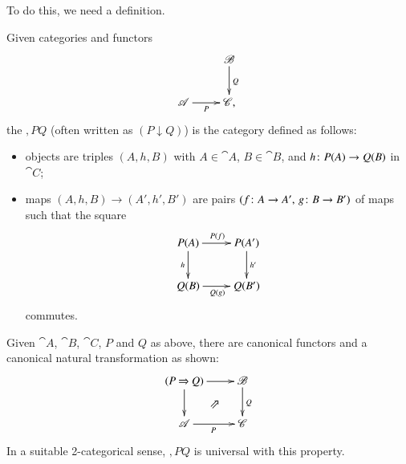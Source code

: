 To do this, we need a definition.

\begin{defn}
\label{defn:comma-cat}
Given categories and functors
\[
\xymatrix{
        &\cat{B} \ar[d]^Q       \\
\cat{A} \ar[r]_P        &
\cat{C},
}
\]
the  $\comma{P}{Q}$%
%
%
(often written as $(P \mathbin{\downarrow} Q)$) is the category defined as
follows:
% 
\begin{itemize}
\item 
objects are triples $(A, h, B)$ with $A \in \cat{A}$, $B \in \cat{B}$, and
$h\from P(A) \to Q(B)$ in $\cat{C}$;

\item 
maps $(A, h, B) \to (A', h', B')$ are pairs $(f\from A \to A',\, g\from B
\to B')$ of maps such that the square
\[
\xymatrix{
P(A)    \ar[r]^{P(f)} \ar[d]_h  &
P(A')   \ar[d]^{h'}     \\
Q(B) \ar[r]_{Q(g)}      &
Q(B')
}
\]
commutes.
\end{itemize}
\end{defn}

\begin{remark}
Given $\cat{A}$, $\cat{B}$, $\cat{C}$, $P$ and $Q$ as above, there
are canonical functors and a canonical natural transformation as shown:
\[
\xymatrix{
\comma{P}{Q} \ar[r] \ar[d] \ar@{}[dr]|-{\nent}  &
\cat{B} \ar[d]^Q        \\
\cat{A} \ar[r]_P        &
\cat{C} 
}
\]
In a suitable 2-categorical sense, $\comma{P}{Q}$ is universal with this
property.
\end{remark}

